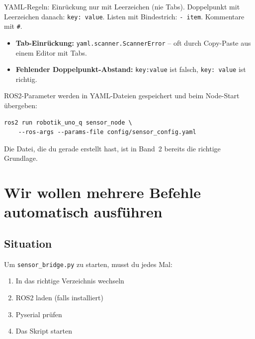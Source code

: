 \begin{merksatzBox}
YAML-Regeln: Einrückung nur mit Leerzeichen (nie Tabs).
Doppelpunkt mit Leerzeichen danach: \texttt{key: value}.
Listen mit Bindestrich: \texttt{- item}.
Kommentare mit \texttt{\#}.
\end{merksatzBox}

\begin{fehlerBox}
\begin{itemize}
  \item \textbf{Tab-Einrückung:} \texttt{yaml.scanner.ScannerError}
        -- oft durch Copy-Paste aus einem Editor mit Tabs.
  \item \textbf{Fehlender Doppelpunkt-Abstand:}
        \texttt{key:value} ist falsch, \texttt{key: value} ist richtig.
\end{itemize}
\end{fehlerBox}

\begin{robotikBox}
ROS2-Parameter werden in YAML-Dateien gespeichert und beim
Node-Start übergeben:
\begin{lstlisting}[style=bash]
ros2 run robotik_uno_q sensor_node \
    --ros-args --params-file config/sensor_config.yaml
\end{lstlisting}
Die Datei, die du gerade erstellt hast, ist in
Band~2 bereits die richtige Grundlage.
\end{robotikBox}

\chapter{Wir wollen mehrere Befehle automatisch ausführen}

\kapitelstruktur

\section{Situation}

Um \texttt{sensor\_bridge.py} zu starten, musst du jedes Mal:
\begin{enumerate}
  \item In das richtige Verzeichnis wechseln
  \item ROS2 laden (falls installiert)
  \item Pyserial prüfen
  \item Das Skript starten
\end{enumerate}

